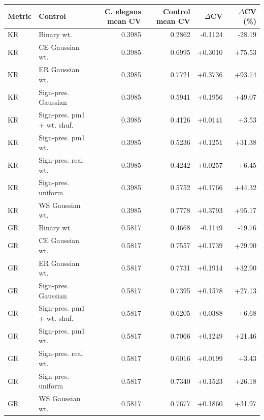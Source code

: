 \begin{tabular}{llrrrr}
\toprule
Metric & Control & C. elegans mean CV & Control mean CV & $\Delta$CV & $\Delta$CV (\%) \\
\midrule
KR & Binary wt. & 0.3985 & 0.2862 & -0.1124 & -28.19 \\
KR & CE Gaussian wt. & 0.3985 & 0.6995 & +0.3010 & +75.53 \\
KR & ER Gaussian wt. & 0.3985 & 0.7721 & +0.3736 & +93.74 \\
KR & Sign-pres. Gaussian & 0.3985 & 0.5941 & +0.1956 & +49.07 \\
KR & Sign-pres. pm1 + wt. shuf. & 0.3985 & 0.4126 & +0.0141 & +3.53 \\
KR & Sign-pres. pm1 wt. & 0.3985 & 0.5236 & +0.1251 & +31.38 \\
KR & Sign-pres. real wt. & 0.3985 & 0.4242 & +0.0257 & +6.45 \\
KR & Sign-pres. uniform & 0.3985 & 0.5752 & +0.1766 & +44.32 \\
KR & WS Gaussian wt. & 0.3985 & 0.7778 & +0.3793 & +95.17 \\
GR & Binary wt. & 0.5817 & 0.4668 & -0.1149 & -19.76 \\
GR & CE Gaussian wt. & 0.5817 & 0.7557 & +0.1739 & +29.90 \\
GR & ER Gaussian wt. & 0.5817 & 0.7731 & +0.1914 & +32.90 \\
GR & Sign-pres. Gaussian & 0.5817 & 0.7395 & +0.1578 & +27.13 \\
GR & Sign-pres. pm1 + wt. shuf. & 0.5817 & 0.6205 & +0.0388 & +6.68 \\
GR & Sign-pres. pm1 wt. & 0.5817 & 0.7066 & +0.1249 & +21.46 \\
GR & Sign-pres. real wt. & 0.5817 & 0.6016 & +0.0199 & +3.43 \\
GR & Sign-pres. uniform & 0.5817 & 0.7340 & +0.1523 & +26.18 \\
GR & WS Gaussian wt. & 0.5817 & 0.7677 & +0.1860 & +31.97 \\
\bottomrule
\end{tabular}
